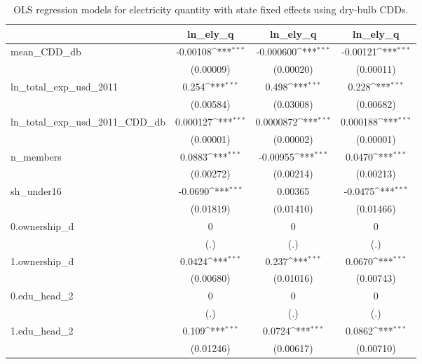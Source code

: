 \begin{table}[htbp]\centering\footnotesize{
\def\sym#1{\ifmmode^{#1}\else\(^{#1}\)\fi}
\caption{OLS regression models for electricity quantity with state fixed effects using dry-bulb CDDs. \label{ely_reg_db}}
\begin{tabular}{l*{3}{c}}
\hline\hline
            &\multicolumn{1}{c}{ln_ely_q}&\multicolumn{1}{c}{ln_ely_q}&\multicolumn{1}{c}{ln_ely_q}\\
\hline
mean_CDD_db &    -0.00108\sym{***}&   -0.000600\sym{***}&    -0.00121\sym{***}\\
            &   (0.00009)         &   (0.00020)         &   (0.00011)         \\
ln_total_exp_usd_2011&       0.254\sym{***}&       0.498\sym{***}&       0.228\sym{***}\\
            &   (0.00584)         &   (0.03008)         &   (0.00682)         \\
ln_total_exp_usd_2011_CDD_db&    0.000127\sym{***}&   0.0000872\sym{***}&    0.000188\sym{***}\\
            &   (0.00001)         &   (0.00002)         &   (0.00001)         \\
n_members   &      0.0883\sym{***}&    -0.00955\sym{***}&      0.0470\sym{***}\\
            &   (0.00272)         &   (0.00214)         &   (0.00213)         \\
sh_under16  &     -0.0690\sym{***}&     0.00365         &     -0.0475\sym{***}\\
            &   (0.01819)         &   (0.01410)         &   (0.01466)         \\
0.ownership_d&           0         &           0         &           0         \\
            &         (.)         &         (.)         &         (.)         \\
1.ownership_d&      0.0424\sym{***}&       0.237\sym{***}&      0.0670\sym{***}\\
            &   (0.00680)         &   (0.01016)         &   (0.00743)         \\
0.edu_head_2&           0         &           0         &           0         \\
            &         (.)         &         (.)         &         (.)         \\
1.edu_head_2&       0.109\sym{***}&      0.0724\sym{***}&      0.0862\sym{***}\\
            &   (0.01246)         &   (0.00617)         &   (0.00710)         \\

\end{tabular}}
\end{table}
